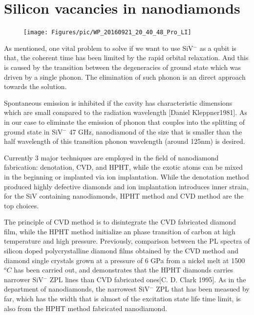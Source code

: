 \section[Silicon vacancies in nanodiamonds]{Silicon vacancies in nanodiamonds}
\FloatBarrier
\begin{figure}[h]
\centering
\texttt{[image: Figures/pic/WP\_20160921\_20\_40\_48\_Pro\_LI]}
\caption{}
\label{fig:wp20160921204048proli}
\end{figure}
\FloatBarrier
As mentioned, one vital problem to solve if we want to use SiV$^{-}$ as a qubit is that, the coherent time has been limited by the rapid orbital relaxation. And this is caused by the transition between the degeneracies of ground state which was driven by a single phonon. The elimination of such phonon is an direct approach towards the solution.

Spontaneous emission is inhibited if the cavity has characteristic dimensions which are small compared to the radiation wavelength [Daniel Kleppner1981]. As in our case to eliminate the emission of phonon that couples into the splitting of ground state in SiV$^{-}$ 47 GHz, nanodiamond of the size that is smaller than the half wavelength of this transition phonon wavelength (around 125nm) is desired. 

Currently 3 major techniques are employed in the field of nanodiamond fabrication: denotation, CVD, and HPHT, while the exotic atoms can be mixed in the beginning or implanted via ion implantation. While the denotation method produced highly defective diamonds and ion implantation introduces inner strain, for the SiV containing nanodiamonds, HPHT method and CVD method are the top choices.

The principle of CVD method is to disintegrate the CVD fabricated diamond film, while the HPHT method initialize an phase transition of carbon at high temperature and high pressure. Previously, comparison between the PL spectra of silicon doped polycrystalline diamond films obtained by the CVD method and diamond single crystals grown at a pressure of 6 GPa from a nickel melt at 1500$^{o}C$ has been carried out, and demonstrates that the HPHT diamonds carries narrower SiV$^{-}$ ZPL lines than CVD fabricated ones[C. D. Clark 1995]. As in the department of nanodiamonds, the narrowest SiV$^{-}$ ZPL that has been measued by far, which has the width that is almost of the excitation state life time limit, is also from the HPHT method fabricated nanodiamond.


